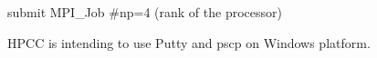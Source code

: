 \begin{itemize}
\end{itemize}

submit MPI\_Job #np=4   
(rank of the processor)

HPCC is intending to use Putty and pscp on Windows platform.   
